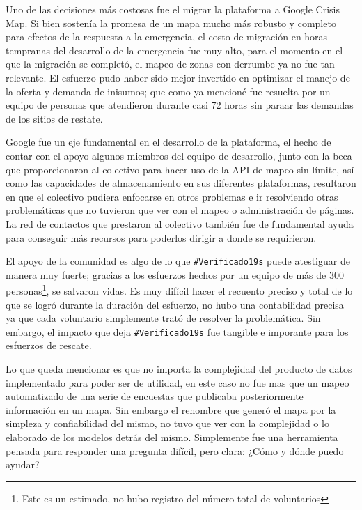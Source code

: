 \documentclass[12pt,spanish,oneside,breaklinks]{book}
\begin{document}
Uno de las decisiones más costosas fue el migrar la plataforma a Google Crisis Map. Si bien sostenía la promesa de un mapa mucho más robusto y completo para efectos de la respuesta a la emergencia, el costo de migración en horas tempranas del desarrollo de la emergencia fue muy alto, para el momento en el que la migración se completó, el mapeo de zonas con derrumbe ya no fue tan relevante. El esfuerzo pudo haber sido mejor invertido en optimizar el manejo de la oferta y demanda de inisumos; que como ya mencioné fue resuelta por un equipo de personas que atendieron durante casi 72 horas sin paraar las demandas de los sitios de restate.

Google fue un eje fundamental en el desarrollo de la plataforma, el hecho de contar con el apoyo algunos miembros del equipo de desarrollo, junto con la beca que proporcionaron al colectivo para hacer uso de la API de mapeo sin límite, así como las capacidades de almacenamiento en sus diferentes plataformas, resultaron en que el colectivo pudiera enfocarse en otros problemas e ir resolviendo otras problemáticas que no tuvieron que ver con el mapeo o administración de páginas. La red de contactos que prestaron al colectivo también fue de fundamental ayuda para conseguir más recursos para poderlos dirigir a donde se requirieron.

El apoyo de la comunidad es  algo de lo que \texttt{\#Verificado19s} puede atestiguar de manera muy fuerte; gracias a los esfuerzos hechos por un equipo de más de 300 personas\footnote{Este es un estimado, no hubo registro del número total de voluntarios}, se salvaron vidas. Es muy difícil hacer el recuento preciso y total de lo que se logró durante la duración del esfuerzo, no hubo una contabilidad precisa ya que cada voluntario simplemente trató de resolver la problemática. Sin embargo, el impacto que deja \texttt{\#Verificado19s} fue tangible e imporante para los esfuerzos de rescate.

Lo que queda mencionar es que no importa la complejidad del producto de datos implementado para poder ser de utilidad, en este caso no fue mas que un mapeo automatizado de una serie de encuestas que publicaba posteriormente información en un mapa. Sin embargo el renombre que generó el mapa por la simpleza y  confiabilidad del mismo, no tuvo que ver con la complejidad o lo elaborado de los modelos detrás del mismo. Simplemente fue una herramienta pensada para responder una pregunta difícil, pero clara: ¿Cómo y dónde puedo ayudar?
\newpage
\end{document}
